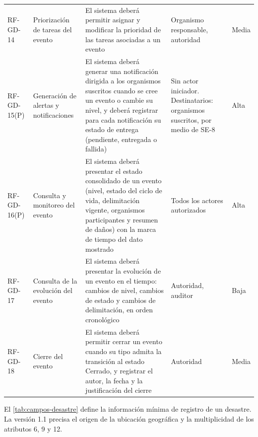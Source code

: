 \documentclass[11pt,letterpaper]{article}
\newcommand{\prim}{\newline (P)}
\begin{document}
\begin{longtable}{L{2.0cm} L{2.9cm} L{6.0cm} L{3.0cm} L{1.2cm}}
RF-GD-14 & Priorización de tareas del evento & El sistema deberá permitir asignar y modificar la
prioridad de las tareas asociadas a un evento & Organismo responsable, autoridad & Media \\
RF-GD-15\prim & Generación de alertas y notificaciones & El sistema deberá generar una notificación
dirigida a los organismos suscritos cuando se cree un evento o cambie su nivel, y deberá registrar
para cada notificación su estado de entrega (pendiente, entregada o fallida) & Sin actor iniciador.
Destinatarios: organismos suscritos, por medio de SE-8 & Alta \\
RF-GD-16\prim & Consulta y monitoreo del evento & El sistema deberá presentar el estado consolidado
de un evento (nivel, estado del ciclo de vida, delimitación vigente, organismos participantes y
resumen de daños) con la marca de tiempo del dato mostrado & Todos los actores autorizados & Alta \\
RF-GD-17 & Consulta de la evolución del evento & El sistema deberá presentar la evolución de un
evento en el tiempo: cambios de nivel, cambios de estado y cambios de delimitación, en orden
cronológico & Autoridad, auditor & Baja \\
RF-GD-18 & Cierre del evento & El sistema deberá permitir cerrar un evento cuando su tipo admita la
transición al estado Cerrado, y registrar el autor, la fecha y la justificación del cierre &
Autoridad & Media \\
\end{longtable}

El \cref{tab:campos-desastre} define la información mínima de registro de un desastre. La versión
1.1 precisa el origen de la ubicación geográfica y la multiplicidad de los atributos 6, 9 y 12.
\end{document}
